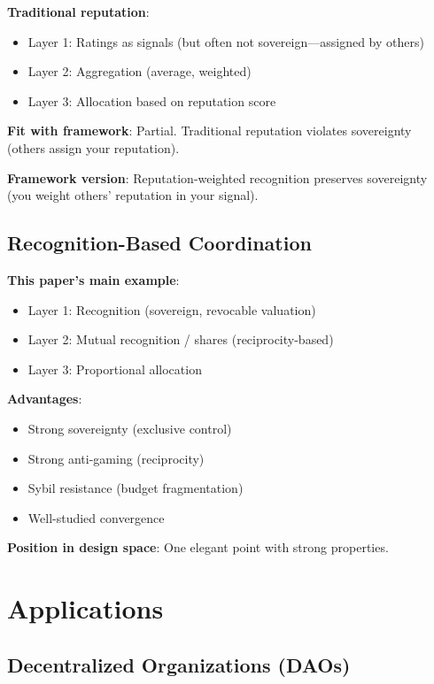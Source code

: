 \documentclass[11pt,a4paper]{article}
\theoremstyle{definition}
\theoremstyle{remark}
\begin{document}
\textbf{Traditional reputation}:
\begin{itemize}
\item Layer 1: Ratings as signals (but often not sovereign---assigned by others)
\item Layer 2: Aggregation (average, weighted)
\item Layer 3: Allocation based on reputation score
\end{itemize}

\textbf{Fit with framework}: Partial. Traditional reputation violates sovereignty (others assign your reputation).

\textbf{Framework version}: Reputation-weighted recognition preserves sovereignty (you weight others' reputation in your signal).

\subsection{Recognition-Based Coordination}

\textbf{This paper's main example}:
\begin{itemize}
\item Layer 1: Recognition (sovereign, revocable valuation)
\item Layer 2: Mutual recognition / shares (reciprocity-based)
\item Layer 3: Proportional allocation
\end{itemize}

\textbf{Advantages}:
\begin{itemize}
\item Strong sovereignty (exclusive control)
\item Strong anti-gaming (reciprocity)
\item Sybil resistance (budget fragmentation)
\item Well-studied convergence
\end{itemize}

\textbf{Position in design space}: One elegant point with strong properties.

\section{Applications}

\subsection{Decentralized Organizations (DAOs)}
\end{document}
